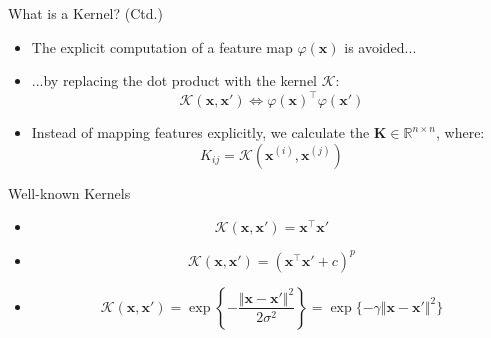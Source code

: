 \begin{frame}{What is a Kernel? (Ctd.)}{}\important
	\begin{itemize}
		\item The explicit computation of a feature map $\varphi(\bm{x})$ is avoided...
		\item ...by replacing the dot product with the kernel $\mathcal{K}$:
		\begin{equation}
			\mathcal{K}(\bm{x}, \bm{x'}) \Leftrightarrow \varphi(\bm{x})^{\intercal} \varphi(\bm{x'})
		\end{equation}
		\item Instead of mapping features explicitly, we calculate the 
			$\bm{K} \in \mathbb{R}^{n \times n}$, where: 
		\begin{equation}
			K_{ij} = \mathcal{K}(\bm{x}^{(i)}, \bm{x}^{(j)})
		\end{equation}
	\end{itemize}
\end{frame}


\begin{frame}{Well-known Kernels}{}\important
	\begin{itemize}
		\item {}
		\begin{equation}
			\mathcal{K}(\bm{x}, \bm{x'}) = \bm{x}^{\intercal} \bm{x'}
		\end{equation}
		\item {}
		\begin{equation}
			\mathcal{K}(\bm{x}, \bm{x'}) = (\bm{x}^{\intercal}\bm{x'} + c)^p
		\end{equation}
		\item {}
		\begin{equation}
			\mathcal{K}(\bm{x}, \bm{x'}) = \exp \left\{ -\frac{\Vert \bm{x} - \bm{x'} \Vert^2}{2 \sigma^2} \right\}
				= \exp \{ -\gamma \Vert \bm{x} - \bm{x'} \Vert^2 \}
		\end{equation}
	\end{itemize}
\end{frame}



